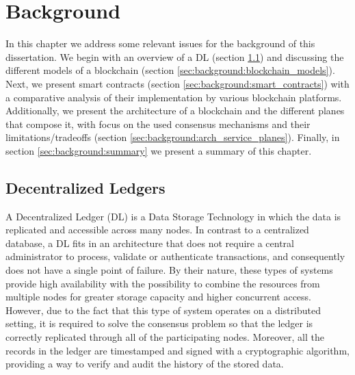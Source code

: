
%

\newcommand{\cmark}{\ding{51}}%
\newcommand{\xmark}{\ding{55}}%

\chapter{Background}
\label{cha:background}

In this chapter we address some relevant issues for the background of this dissertation. We begin with an overview of a \gls{DL} (section \ref{sec:background:decentralized_ledgers}) and discussing the different models of a blockchain (section \ref{sec:background:blockchain_models}). Next, we present smart contracts (section \ref{sec:background:smart_contracts}) with a comparative analysis of their implementation by various blockchain platforms. Additionally, we present the architecture of a blockchain and the different planes that compose it, with focus on the used consensus mechanisms and their limitations/tradeoffs (section \ref{sec:background:arch_service_planes}). %
Finally, in section \ref{sec:background:summary} we present a summary of this chapter.



\section{Decentralized Ledgers}
\label{sec:background:decentralized_ledgers}

A Decentralized Ledger (\gls{DL}) is a Data Storage Technology in which the data is replicated and accessible across many nodes. In contrast to a centralized database, a \gls{DL} fits in an architecture that does not require a central administrator to process, validate or authenticate transactions, and consequently does not have a single point of failure. By their nature, these types of systems provide high availability with the possibility to combine the resources from multiple nodes for greater storage capacity and higher concurrent access. However, due to the fact that this type of system operates on a distributed setting, it is required to solve the consensus problem so that the ledger is correctly replicated through all of the participating nodes. Moreover, all the records in the ledger are timestamped and signed with a cryptographic algorithm, providing a way to verify and audit the history of the stored data.

